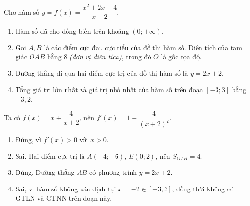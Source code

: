 \begin{baitap}
	Cho hàm số $y = f(x) = \dfrac{x^2 + 2x + 4}{x + 2}$.
	\begin{enumerate}
		\item Hàm số đã cho đồng biến trên khoảng $(0; +\infty)$.
		\item Gọi $A, B$ là các điểm cực đại, cực tiểu của đồ thị hàm số. Diện tích của tam giác $OAB$ bằng $8$ \textit{(đơn vị diện tích)}, trong đó $O$ là gốc tọa độ.
		\item Đường thẳng đi qua hai điểm cực trị của đồ thị hàm số là $y = 2x + 2$.
		\item Tổng giá trị lớn nhất và giá trị nhỏ nhất của hàm số trên đoạn $[-3; 3]$ bằng $-3{,}2$.
	\end{enumerate}
	\begin{traloi}
		Ta có \(f(x)=x+\dfrac{4}{x+2}\), nên \(f'(x)=1-\dfrac{4}{(x+2)^2}\).
		\begin{enumerate}
			\item Đúng, vì \(f'(x)>0\) với \(x>0\).
			\item Sai. Hai điểm cực trị là \(A(-4;-6)\), \(B(0;2)\), nên \(S_{OAB}=4\).
			\item Đúng. Đường thẳng \(AB\) có phương trình \(y=2x+2\).
			\item Sai, vì hàm số không xác định tại \(x=-2\in[-3;3]\), đồng thời không có GTLN và GTNN trên đoạn này.
		\end{enumerate}
	\end{traloi}
\end{baitap}

